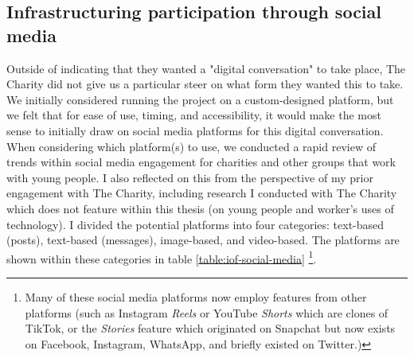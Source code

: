 \subsection{Infrastructuring participation through social media}

Outside of indicating that they wanted a "digital conversation" to take place, The Charity did not give us a particular steer on what form they wanted this to take. We initially considered running the project on a custom-designed platform, but we felt that for ease of use, timing, and accessibility, it would make the most sense to initially draw on social media platforms for this digital conversation. When considering which platform(s) to use,  we conducted a rapid review of trends within social media engagement for charities and other groups that work with young people. I also reflected on this from the perspective of my prior engagement with The Charity, including research I conducted with The Charity which does not feature within this thesis (on young people and worker's uses of technology). I divided the potential platforms into four categories: text-based (posts), text-based (messages), image-based, and video-based.  The platforms are shown within these categories in table \ref{table:iof-social-media} \footnote{Many of these social media platforms now employ features from other platforms (such as Instagram \textit{Reels} or YouTube \textit{Shorts} which are clones of TikTok, or the \textit{Stories} feature which originated on Snapchat but now exists on Facebook, Instagram, WhatsApp, and briefly existed on Twitter.)}.

